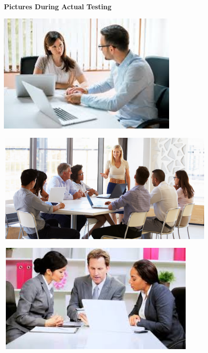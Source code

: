 \begin{center} 
	\textbf{}
\end{center}

\begin{center} 
	\textbf{Pictures During Actual Testing}
\end{center}

\begin{center}
	\includegraphics[width=9cm,height=6cm]{image/testdoc.jpg}
\end{center}

\begin{center}
	\includegraphics[width=11cm,height=5.5cm]{image/testdoc2.jpg}
\end{center}

\begin{center}
	\includegraphics[width=10cm,height=5.5cm]{image/testdoc3.jpg}
\end{center}